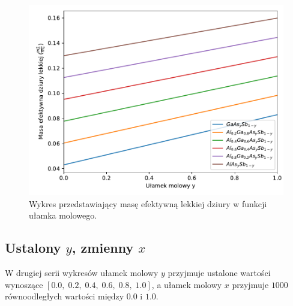 \documentclass[12pt,openany,a4paper]{book}
\begin{document}
\begin{figure}[H]
	\centering
	\includegraphics[width = 0.9\linewidth]{Figures/quaternary/quat_m_lh_x.pdf}
	\caption{Wykres przedstawiający masę efektywną lekkiej dziury w funkcji ułamka 
	molowego.}\label{fig:quat_mlh_x}
\end{figure}

\subsection{Ustalony \(y\), zmienny \(x\)}
W drugiej serii wykresów ułamek molowy \(y\) przyjmuje ustalone
wartości wynoszące \([0.0,\;0.2,\; 0.4,\; 0.6,\; 0.8,\; 1.0]\), a ułamek molowy \(x\)
przyjmuje \(1000\) równoodległych wartości między \(0.0\) i \(1.0\). 
\end{document}
